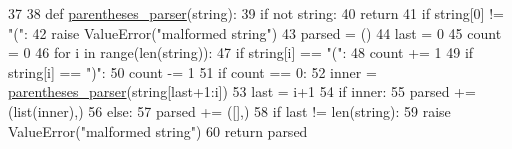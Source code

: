 \begin{DoxyCode}
37 
38 \textcolor{keyword}{def }\hyperlink{namespacetune_1_1common_1_1parentheses__parser_a05cf9ed33956f07959abd63f2a8c525c}{parentheses\_parser}(string):
39     \textcolor{keywordflow}{if} \textcolor{keywordflow}{not} string:
40         \textcolor{keywordflow}{return}
41     \textcolor{keywordflow}{if} string[0] != \textcolor{stringliteral}{"("}:
42         \textcolor{keywordflow}{raise} ValueError(\textcolor{stringliteral}{"malformed string"})
43     parsed = ()
44     last = 0
45     count = 0
46     \textcolor{keywordflow}{for} i \textcolor{keywordflow}{in} range(len(string)):
47         \textcolor{keywordflow}{if} string[i] == \textcolor{stringliteral}{"("}:
48             count += 1
49         \textcolor{keywordflow}{if} string[i] == \textcolor{stringliteral}{")"}:
50             count -= 1
51         \textcolor{keywordflow}{if} count == 0:
52             inner = \hyperlink{namespacetune_1_1common_1_1parentheses__parser_a05cf9ed33956f07959abd63f2a8c525c}{parentheses\_parser}(string[last+1:i])
53             last = i+1
54             \textcolor{keywordflow}{if} inner:
55                 parsed += (list(inner),)
56             \textcolor{keywordflow}{else}:
57                 parsed += ([],)
58     \textcolor{keywordflow}{if} last != len(string):
59         \textcolor{keywordflow}{raise} ValueError(\textcolor{stringliteral}{"malformed string"})
60     \textcolor{keywordflow}{return} parsed
\end{DoxyCode}
